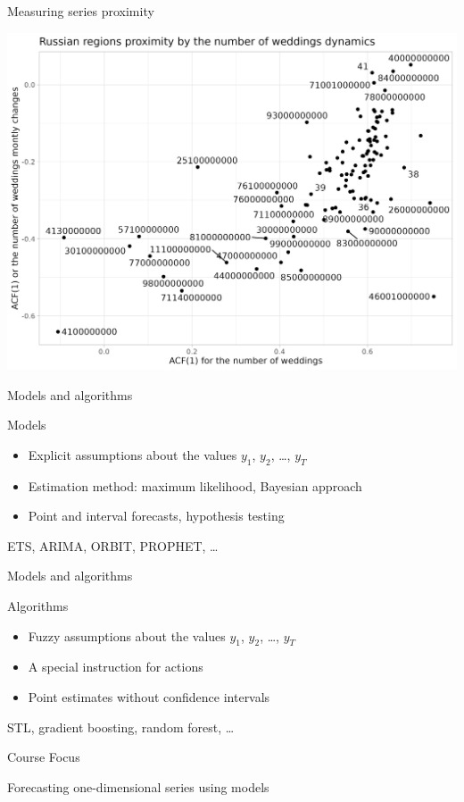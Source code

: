 \begin{frame}{Measuring series proximity}
	
	\includegraphics[width=\textwidth]{pictures/om_ts_01-025.png}
	
	
\end{frame}



\begin{frame}{Models and algorithms}
	
	\begin{block}{Models}
		\begin{itemize}[<+->]
			\item Explicit assumptions about the values $y_1$, $y_2$, \ldots, $y_T$
			\item Estimation method: maximum likelihood, Bayesian approach
			\item Point and interval forecasts, hypothesis testing
		\end{itemize}
	\end{block}
	
	ETS, ARIMA, ORBIT, PROPHET, \ldots
	
\end{frame}

\begin{frame}{Models and algorithms}
	
	\begin{block}{Algorithms}
		\begin{itemize}[<+->]
			\item Fuzzy assumptions about the values $y_1$, $y_2$, \ldots, $y_T$
			\item A special instruction for actions
			\item Point estimates without confidence intervals
		\end{itemize}
	\end{block}
	
	STL, gradient boosting, random forest, \ldots
	
\end{frame}

\begin{frame}{Course Focus}
	
	Forecasting one-dimensional series using models
	
\end{frame}